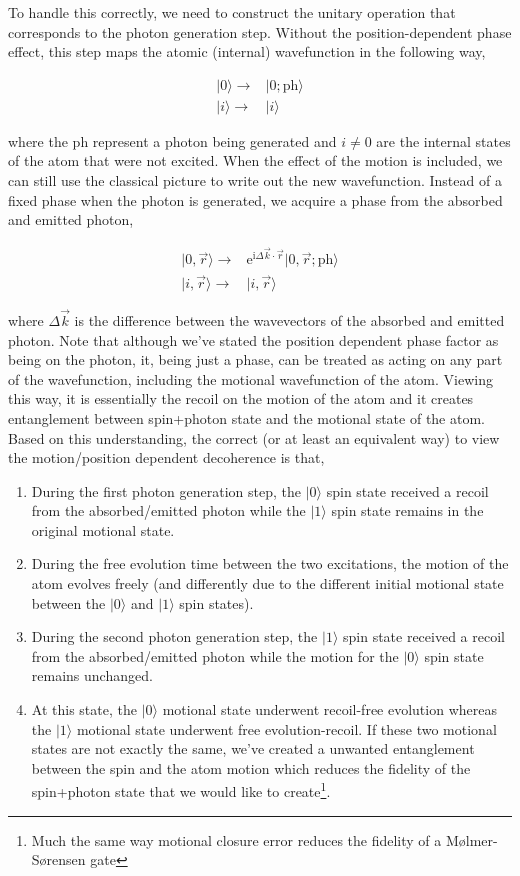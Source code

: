 \documentclass[10pt,fleqn]{article}
\newcommand{\ue}{\mathrm{e}}
\newcommand{\ui}{\mathrm{i}}
\newcommand{\eqar}[1]
{
  \begin{align}
    #1
  \end{align}
}
\begin{document}
To handle this correctly, we need to construct the unitary operation that corresponds
to the photon generation step. Without the position-dependent phase effect,
this step maps the atomic (internal) wavefunction in the following way,
\eqar{
  |0\rangle\rightarrow&|0;\mathrm{ph}\rangle\\
  |i\rangle\rightarrow&|i\rangle
}
where the $\mathrm{ph}$ represent a photon being generated and $i\neq0$
are the internal states of the atom that were not excited.
When the effect of the motion is included, we can still use the classical picture
to write out the new wavefunction.
Instead of a fixed phase when the photon is generated, we acquire a phase
from the absorbed and emitted photon,
\eqar{
  |0,\vec r\rangle\rightarrow&\ue^{\ui\Delta\vec k\cdot\vec r}|0,\vec r;\mathrm{ph}\rangle\\
  |i,\vec r\rangle\rightarrow&|i,\vec r\rangle
}
where $\Delta\vec k$ is the difference between the wavevectors of the absorbed
and emitted photon. Note that although we've stated the position dependent phase factor
as being on the photon, it, being just a phase, can be treated as acting on any part
of the wavefunction, including the motional wavefunction of the atom.
Viewing this way, it is essentially the recoil on the motion of the atom
and it creates entanglement between spin+photon state
and the motional state of the atom.\\

Based on this understanding, the correct (or at least an equivalent way)
to view the motion/position dependent decoherence is that,
\begin{enumerate}
\item During the first photon generation step, the $|0\rangle$ spin state
  received a recoil from the absorbed/emitted photon while the $|1\rangle$ spin state
  remains in the original motional state.
\item During the free evolution time between the two excitations,
  the motion of the atom evolves freely (and differently
  due to the different initial motional state
  between the $|0\rangle$ and $|1\rangle$ spin states).
\item During the second photon generation step, the $|1\rangle$ spin state
  received a recoil from the absorbed/emitted photon while the motion for the
  $|0\rangle$ spin state remains unchanged.
\item At this state, the $|0\rangle$ motional state underwent recoil-free evolution
  whereas the $|1\rangle$ motional state underwent free evolution-recoil.
  If these two motional states are not exactly the same,
  we've created a unwanted entanglement between the spin and the atom motion
  which reduces the fidelity of the spin+photon state that we would like to create\footnote{Much the same way motional closure error reduces the fidelity of a M{\o}lmer-S{\o}rensen gate}.
\end{enumerate}
\end{document}
